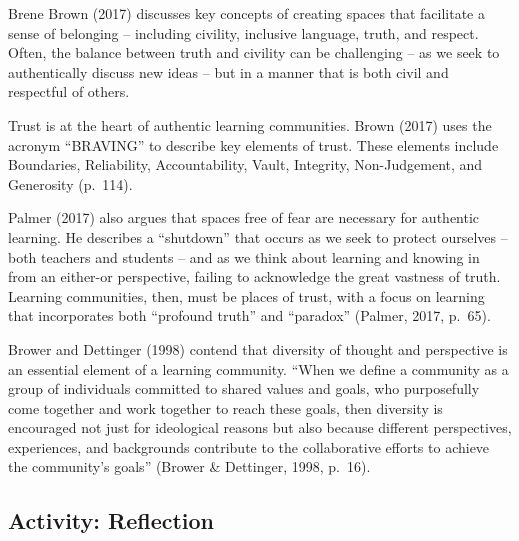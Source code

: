 \documentclass[
]{book}
\begin{document}
Brene Brown (2017) discusses key concepts of creating spaces that facilitate a sense of belonging -- including civility, inclusive language, truth, and respect. Often, the balance between truth and civility can be challenging -- as we seek to authentically discuss new ideas -- but in a manner that is both civil and respectful of others.

Trust is at the heart of authentic learning communities. Brown (2017) uses the acronym ``BRAVING'' to describe key elements of trust. These elements include Boundaries, Reliability, Accountability, Vault, Integrity, Non-Judgement, and Generosity (p.~114).

Palmer (2017) also argues that spaces free of fear are necessary for authentic learning. He describes a ``shutdown'' that occurs as we seek to protect ourselves -- both teachers and students -- and as we think about learning and knowing in from an either-or perspective, failing to acknowledge the great vastness of truth. Learning communities, then, must be places of trust, with a focus on learning that incorporates both ``profound truth'' and ``paradox'' (Palmer, 2017, p.~65).

Brower and Dettinger (1998) contend that diversity of thought and perspective is an essential element of a learning community. ``When we define a community as a group of individuals committed to shared values and goals, who purposefully come together and work together to reach these goals, then diversity is encouraged not just for ideological reasons but also because different perspectives, experiences, and backgrounds contribute to the collaborative efforts to achieve the community's goals'' (Brower \& Dettinger, 1998, p.~16).

\hypertarget{activity-reflection}{%
\subsection*{Activity: Reflection}\label{activity-reflection}}
\end{document}
